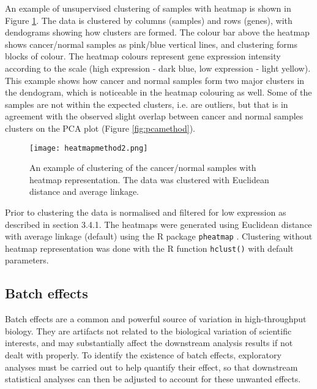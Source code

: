    An example of unsupervised clustering of samples with heatmap is shown in Figure \ref{fig:heatmapmethod}. The data is clustered by columns (samples) and rows (genes), with dendograms showing how clusters are formed. The colour bar above the heatmap shows cancer/normal samples as pink/blue vertical lines, and clustering forms blocks of colour. The heatmap colours  represent gene expression intensity according to the scale (high expression - dark blue, low expression - light yellow). 
   This example shows how cancer and normal samples form two major clusters in the dendogram, which is noticeable in the heatmap colouring as well. Some of the samples are not within the expected clusters, i.e. are outliers, but that is in agreement with the observed  slight overlap between cancer and normal samples clusters on the PCA plot (Figure \ref{fig:pcamethod}).

        \begin{figure}[h]
        \centering
        \texttt{[image: heatmapmethod2.png]}
        \caption{An example of clustering of the cancer/normal samples with heatmap representation. The data was clustered with Euclidean distance and average linkage. }
        \label{fig:heatmapmethod}
        \end{figure}
    
    Prior to clustering the data is normalised and filtered for low expression as described in section 3.4.1. The heatmaps were generated using Euclidean distance with average linkage (default) using the R package  \texttt{pheatmap} \cite{kolde2012pheatmap}. Clustering without heatmap representation was done with the R function \texttt{hclust()} with default parameters.


   

\newpage


\subsection{Batch effects}

Batch effects are a common and powerful source of variation in high-throughput biology.  They are artifacts not related to the biological variation of scientific interests, and may substantially affect the downstream analysis results if not dealt with properly. 
To identify the existence of batch effects, exploratory analyses must be carried out to help quantify their effect, so that downstream statistical analyses can then be adjusted to account for these unwanted effects. 
 
